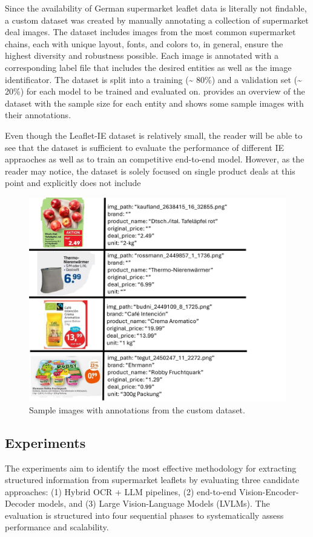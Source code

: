\documentclass[11pt]{article}
\begin{document}
Since the availability of German supermarket leaflet data is literally not findable, a custom dataset was created by manually annotating a collection of supermarket deal images. The dataset includes images from the most common supermarket chains, each with unique layout, fonts, and colors to, in general, ensure the highest diversity and robustness possible. Each image is annotated with a corresponding label file that includes the desired entities as well as the image identificator. The dataset is split into a training (\~{} 80\%) and a validation set (\~{} 20\%) for each model to be trained and evaluated on.  provides an overview of the dataset with the sample size for each entity and  shows some sample images with their annotations.

Even though the Leaflet-IE dataset is relatively small, the reader will be able to see that the dataset is sufficient to evaluate the performance of different IE appraoches as well as to train an competitive end-to-end model. However, as the reader may notice, the dataset is solely focused on single product deals at this point and explicitly does not include 

\begin{figure}[h!]
\centering
\includegraphics[width=0.5\linewidth]{figures/ie_samples.png}
\caption{Sample images with annotations from the custom dataset.}
\label{fig:ie_dataset_samples}
\end{figure}

\subsection{Experiments}

The experiments aim to identify the most effective methodology for extracting structured information from supermarket leaflets by evaluating three candidate approaches: (1) Hybrid OCR + LLM pipelines, (2) end-to-end Vision-Encoder-Decoder models, and (3) Large Vision-Language Models (LVLMs). The evaluation is structured into four sequential phases to systematically assess performance and scalability.
\end{document}
